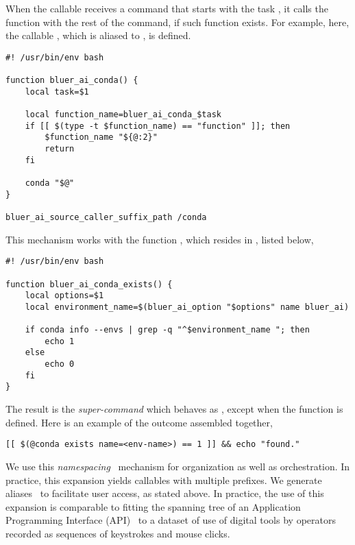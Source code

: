 When the callable  receives a command that starts with the task , it calls the function  with the rest of the command, if such function exists. For example, here, the callable , which is aliased to , is defined.

\begin{graybox}
\begin{verbatim}
#! /usr/bin/env bash

function bluer_ai_conda() {
    local task=$1

    local function_name=bluer_ai_conda_$task
    if [[ $(type -t $function_name) == "function" ]]; then
        $function_name "${@:2}"
        return
    fi

    conda "$@"
}

bluer_ai_source_caller_suffix_path /conda
\end{verbatim}
\end{graybox}
%
This mechanism works with the function , which resides in , listed below,
%
\begin{graybox}
\begin{verbatim}
#! /usr/bin/env bash

function bluer_ai_conda_exists() {
    local options=$1
    local environment_name=$(bluer_ai_option "$options" name bluer_ai)

    if conda info --envs | grep -q "^$environment_name "; then
        echo 1
    else
        echo 0
    fi
}    
\end{verbatim}
\end{graybox}
%
The result is the \emph{super-command}  which behaves as , except when the function  is defined. Here is an example of the outcome assembled together,
%
\begin{graybox}
\begin{verbatim}
[[ $(@conda exists name=<env-name>) == 1 ]] && echo "found."
\end{verbatim}
\end{graybox}
%
We use this \emph{namespacing}~\cite{namespaces} mechanism for organization as well as orchestration. In practice, this expansion yields callables with multiple prefixes. We generate  aliases~\cite{aliases} to facilitate user access, as stated above. In practice, the use of this expansion is comparable to fitting the spanning tree of an Application Programming Interface (API)~\cite{fielding2000rest} to a dataset of use of digital tools by operators recorded as sequences of keystrokes and mouse clicks.